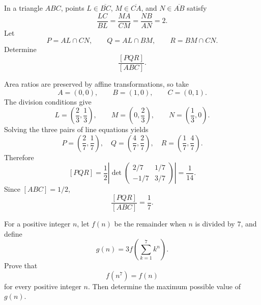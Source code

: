     \begin{expectedproblem}
        In a triangle $ABC$, points $L\in\overline{BC}$,
        $M\in\overline{CA}$, and $N\in\overline{AB}$ satisfy
        \[
            \frac{LC}{BL}
            =
            \frac{MA}{CM}
            =
            \frac{NB}{AN}
            =2.
        \]
        Let
        \[
            P=AL\cap CN,
            \qquad
            Q=AL\cap BM,
            \qquad
            R=BM\cap CN.
        \]
        Determine
        \[
            \frac{[PQR]}{[ABC]}.
        \]
    \end{expectedproblem}

    \begin{solution}
        Area ratios are preserved by affine transformations, so take
        \[
            A=(0,0),
            \qquad
            B=(1,0),
            \qquad
            C=(0,1).
        \]
        The division conditions give
        \[
            L=\left(\frac23,\frac13\right),
            \qquad
            M=\left(0,\frac23\right),
            \qquad
            N=\left(\frac13,0\right).
        \]
        Solving the three pairs of line equations yields
        \[
            P=\left(\frac27,\frac17\right),
            \quad
            Q=\left(\frac47,\frac27\right),
            \quad
            R=\left(\frac17,\frac47\right).
        \]
        Therefore
        \[
            [PQR]
            =
            \frac12
            \left|
                \det
                \begin{pmatrix}
                    2/7 & 1/7\\
                    -1/7 & 3/7
                \end{pmatrix}
            \right|
            =
            \frac{1}{14}.
        \]
        Since $[ABC]=1/2$,
        \[
            \boxed{
                \frac{[PQR]}{[ABC]}=\frac17
            }.
        \]
    \end{solution}

    \begin{expectedproblem}
        For a positive integer $n$, let $f(n)$ be the remainder when $n$ is
        divided by $7$, and define
        \[
            g(n)
            =
            3f\left(\sum_{k=1}^{7}k^n\right).
        \]
        Prove that
        \[
            f(n^7)=f(n)
        \]
        for every positive integer $n$. Then determine the maximum possible
        value of $g(n)$.
    \end{expectedproblem}

